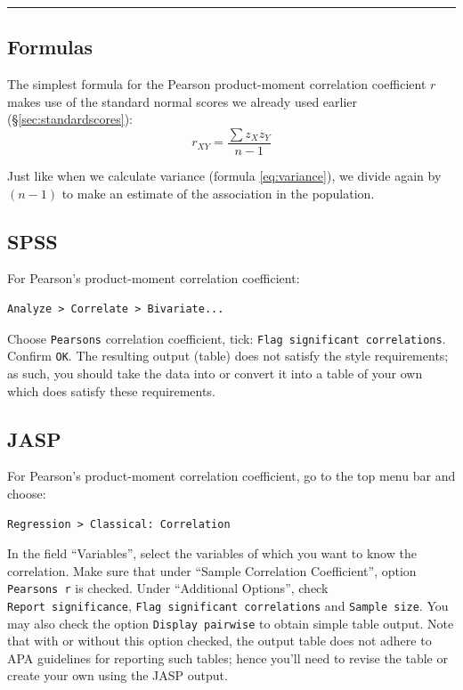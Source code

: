\documentclass[
]{book}
\begin{document}
\begin{center}\rule{0.5\linewidth}{0.5pt}\end{center}

\hypertarget{formulas-3}{%
\subsection{Formulas}\label{formulas-3}}

The simplest formula for the Pearson product-moment correlation coefficient
\(r\) makes use of the standard normal scores we already used earlier
(§\ref{sec:standardscores}):
\begin{equation}
    r_{XY} = \frac{\sum z_X z_Y}{n-1}
  \label{eq:pearson}
\end{equation}

Just like when we calculate variance
(formula \eqref{eq:variance}), we divide again by
\((n-1)\) to make an estimate of the association in the population.

\hypertarget{spss-5}{%
\subsection{SPSS}\label{spss-5}}

For Pearson's product-moment correlation coefficient:

\begin{verbatim}
Analyze > Correlate > Bivariate...
\end{verbatim}

Choose \texttt{Pearsons} correlation coefficient, tick:
\texttt{Flag\ significant\ correlations}. Confirm \texttt{OK}. The resulting
output (table) does not satisfy the style requirements; as such, you should
take the data into or convert it into a table of your own which does satisfy these requirements.

\hypertarget{jasp-6}{%
\subsection{JASP}\label{jasp-6}}

For Pearson's product-moment correlation coefficient, go to the top menu bar and choose:

\begin{verbatim}
Regression > Classical: Correlation
\end{verbatim}

In the field ``Variables'', select the variables of which you want to know the correlation.
Make sure that under ``Sample Correlation Coefficient'', option \texttt{Pearson\textquotesingle{}s\ r} is checked.
Under ``Additional Options'', check \texttt{Report\ significance}, \texttt{Flag\ significant\ correlations} and \texttt{Sample\ size}. You may also check the option \texttt{Display\ pairwise} to obtain simple table output.
Note that with or without this option checked, the output table does not adhere to APA guidelines for reporting such tables; hence you'll need to revise the table or create your own using the JASP output.
\end{document}
